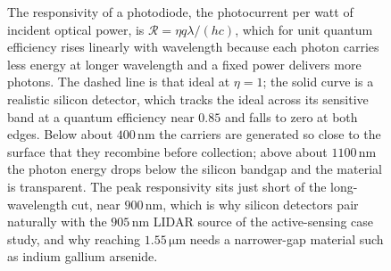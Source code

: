 \begin{figure}[htbp]
\centering
{}
\caption[Photodiode responsivity against wavelength]{The responsivity of a
photodiode, the photocurrent per watt of incident optical power, is
$\mathcal{R}=\eta q\lambda/(hc)$, which for unit quantum efficiency rises linearly
with wavelength because each photon carries less energy at longer wavelength and a
fixed power delivers more photons. The dashed line is that ideal at $\eta=1$; the
solid curve is a realistic silicon detector, which tracks the ideal across its
sensitive band at a quantum efficiency near $0.85$ and falls to zero at both
edges. Below about $400\,\si{\nano\meter}$ the carriers are generated so close to
the surface that they recombine before collection; above about
$1100\,\si{\nano\meter}$ the photon energy drops below the silicon bandgap and the
material is transparent. The peak responsivity sits just short of the
long-wavelength cut, near $900\,\si{\nano\meter}$, which is why silicon detectors
pair naturally with the $905\,\si{\nano\meter}$ LIDAR source of the active-sensing
case study, and why reaching $1.55\,\si{\micro\meter}$ needs a
narrower-gap material such as indium gallium arsenide.}
\label{fig:vol04ch11:photodiode-responsivity}
\end{figure}
